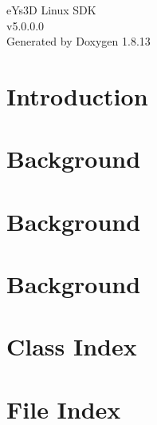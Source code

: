 \documentclass[twoside]{book}
\newcommand{\+}{\discretionary{\mbox{\scriptsize$\hookleftarrow$}}{}{}}
\newcommand{\clearemptydoublepage}{%
  \newpage{\pagestyle{empty}\cleardoublepage}%
}
\begin{document}
\hypersetup{pageanchor=false,
             bookmarksnumbered=true,
             pdfencoding=unicode
            }
\begin{titlepage}
\vspace*{7cm}
\begin{center}%
{\Large e\+Ys3D Linux S\+DK \\[1ex]\large v5.\+0.\+0.\+0 }\\
\vspace*{1cm}
{\large Generated by Doxygen 1.8.13}\\
\end{center}
\end{titlepage}
\clearemptydoublepage
{}
\tableofcontents
\clearemptydoublepage
{}
\hypersetup{pageanchor=true}

\chapter{Introduction}
\label{index}\hypertarget{index}{}
\chapter{Background}
\label{md_e_s_p_d_i_turbojpeg_arm64_share_doc_libjpeg-turbo__r_e_a_d_m_e}

\chapter{Background}
\label{md_e_s_p_d_i_turbojpeg_armhf_ti_32_share_doc_libjpeg-turbo__r_e_a_d_m_e}

\chapter{Background}
\label{md_e_s_p_d_i_turbojpeg__t_x2_share_doc_libjpeg-turbo__r_e_a_d_m_e}

\chapter{Class Index}

\chapter{File Index}

\end{document}
